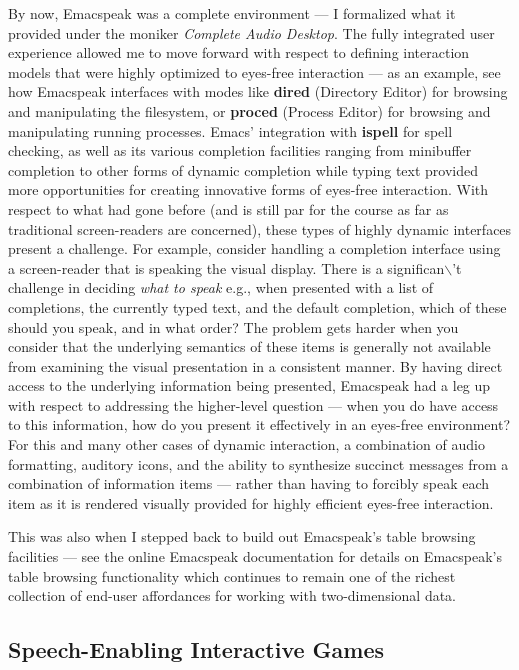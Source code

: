 \documentclass[11pt]{article}
\begin{document}
By now, Emacspeak was a complete environment — I formalized what
it provided under the moniker \emph{Complete Audio Desktop}. The fully
integrated user experience allowed me to move forward with
respect to defining interaction models that were highly optimized
to eyes-free interaction — as an example, see how Emacspeak
interfaces with modes like \textbf{dired} (Directory Editor) for
browsing and manipulating the filesystem, or \textbf{proced} (Process
Editor) for browsing and manipulating running processes. Emacs'
integration with \textbf{ispell} for spell checking, as well as its
various completion facilities ranging from minibuffer completion
to other forms of dynamic completion while typing text provided
more opportunities for creating innovative forms of eyes-free
interaction. With respect to what had gone before (and is still
par for the course as far as traditional screen-readers are
concerned), these types of highly dynamic interfaces present a
challenge. For example, consider handling a completion interface
using a screen-reader that is speaking the visual display. There
is a significan$\backslash$'t challenge in deciding \emph{what to speak} e.g., when
presented with a list of completions, the currently typed text,
and the default completion, which of these should you speak, and
in what order? The problem gets harder when you consider that the
underlying semantics of these items is generally not available
from examining the visual presentation in a consistent manner. By
having direct access to the underlying information being
presented, Emacspeak had a leg up with respect to addressing the
higher-level question — when you do have access to this
information, how do you present it effectively in an eyes-free
environment? For this and many other cases of dynamic
interaction, a combination of audio formatting, auditory icons,
and the ability to synthesize succinct messages from a
combination of information items — rather than having to forcibly
speak each item as it is rendered visually provided for highly
efficient eyes-free interaction.


This was also when I stepped back to build out Emacspeak's table
browsing facilities — see the online Emacspeak documentation for
details on Emacspeak's table browsing functionality which
continues to remain one of the richest collection of end-user
affordances for working with two-dimensional data.


\subsection{Speech-Enabling Interactive Games}
\label{sec:org832185f}
\end{document}
